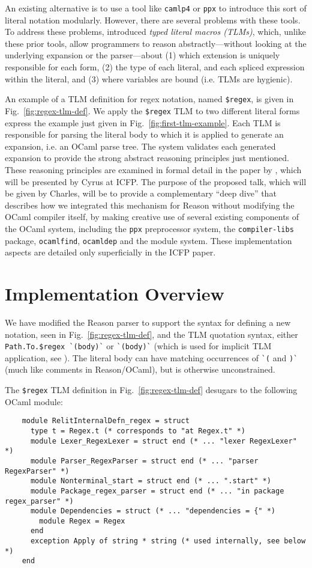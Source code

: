 \documentclass[acmsmall]{acmart}
\newcommand{\li}[1]{\lstinline[basicstyle=\ttfamily\fontsize{9pt}{1em}\selectfont]{#1}}
\theoremstyle{slplain}
\numberwithin{thm}{section}
\begin{document}
An existing alternative is to use a tool like \li{camlp4} or \li{ppx} to introduce this sort of literal notation modularly. However, there are several problems with these tools. To address these problems, \citet{TLMs-paper} introduced \emph{typed literal macros (TLMs)}, which, unlike these prior tools, allow programmers to reason abstractly---without looking at the underlying expansion or the parser---about (1) which extension is uniquely responsible for each form, (2) the type of each literal, and each spliced expression within the literal, and (3) where variables are bound (i.e. TLMs are hygienic).

An example of a TLM definition for regex notation, named \li{$regex}, is given in Fig.~\ref{fig:regex-tlm-def}. We apply the \li{$regex} TLM to two different literal forms express 
the example just given in Fig.~\ref{fig:first-tlm-example}. Each TLM is responsible for parsing the literal body to which it is applied to generate an expansion, i.e. an OCaml parse tree. The system validates each generated expansion to provide the strong abstract reasoning principles just mentioned. These reasoning principles are examined in formal detail in the paper by \citet{TLMs-paper}, which will be presented by Cyrus at ICFP. The purpose of the proposed talk, which will be given by Charles, will be to provide a complementary ``deep dive'' that describes how we integrated this mechanism for Reason without modifying the OCaml compiler itself, by making creative use of several existing components of the OCaml system, including the \li{ppx} preprocessor system, the \li{compiler-libs} package, \li{ocamlfind}, \li{ocamldep} and the module system. These implementation aspects are detailed only superficially in the ICFP paper.


\section{Implementation Overview}

We have modified the Reason parser to support the syntax for defining a new notation, seen in Fig.~\ref{fig:regex-tlm-def}, and the TLM quotation syntax, either \li{Path.To.$regex `(body)`} or \li{`(body)`} (which is used for implicit TLM application, see \cite{TLMs-paper}). The literal body can have matching occurrences of \li{`(} and \li{)`} (much like comments in Reason/OCaml), but is otherwise unconstrained.

The \li{$regex} TLM definition in Fig.~\ref{fig:regex-tlm-def} desugars to the following OCaml module:
\begin{lstlisting}
    module RelitInternalDefn_regex = struct
      type t = Regex.t (* corresponds to "at Regex.t" *)
      module Lexer_RegexLexer = struct end (* ... "lexer RegexLexer" *)
      module Parser_RegexParser = struct end (* ... "parser RegexParser" *)
      module Nonterminal_start = struct end (* ... ".start" *)
      module Package_regex_parser = struct end (* ... "in package regex_parser" *)
      module Dependencies = struct (* ... "dependencies = {" *)
        module Regex = Regex
      end
      exception Apply of string * string (* used internally, see below *)
    end
\end{lstlisting}
\end{document}

